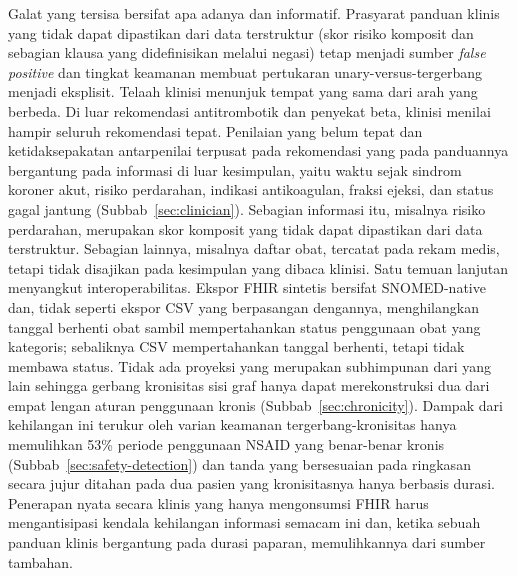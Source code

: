 Galat yang tersisa bersifat apa adanya dan informatif. Prasyarat panduan klinis yang tidak dapat
dipastikan dari data terstruktur (skor risiko komposit dan sebagian klausa yang didefinisikan
melalui negasi) tetap menjadi sumber \emph{false positive} dan tingkat keamanan membuat
pertukaran unary-versus-tergerbang menjadi eksplisit. Telaah klinisi menunjuk tempat yang
sama dari arah yang berbeda. Di luar rekomendasi antitrombotik dan penyekat beta, klinisi
menilai hampir seluruh rekomendasi tepat. Penilaian yang belum tepat dan ketidaksepakatan
antarpenilai terpusat pada rekomendasi yang pada panduannya bergantung pada informasi di luar
kesimpulan, yaitu waktu sejak sindrom koroner akut, risiko perdarahan, indikasi antikoagulan,
fraksi ejeksi, dan status gagal jantung (Subbab~\ref{sec:clinician}). Sebagian informasi itu,
misalnya risiko perdarahan, merupakan skor komposit yang tidak dapat dipastikan dari data
terstruktur. Sebagian lainnya, misalnya daftar obat, tercatat pada rekam medis, tetapi tidak
disajikan pada kesimpulan yang dibaca klinisi. Satu temuan lanjutan menyangkut
interoperabilitas. Ekspor FHIR sintetis bersifat SNOMED-native dan, tidak seperti ekspor CSV
yang berpasangan dengannya, menghilangkan tanggal berhenti obat sambil mempertahankan status penggunaan
obat yang kategoris; sebaliknya CSV mempertahankan tanggal berhenti, tetapi tidak membawa
status. Tidak ada proyeksi yang merupakan subhimpunan dari yang lain sehingga gerbang
kronisitas sisi graf hanya dapat merekonstruksi dua dari empat lengan aturan penggunaan kronis
(Subbab~\ref{sec:chronicity}). Dampak dari kehilangan ini terukur oleh varian
keamanan tergerbang-kronisitas hanya memulihkan 53\% periode penggunaan NSAID yang
benar-benar kronis (Subbab~\ref{sec:safety-detection}) dan tanda yang bersesuaian pada
ringkasan secara jujur ditahan pada dua pasien yang kronisitasnya hanya berbasis durasi.
Penerapan nyata secara klinis yang hanya mengonsumsi FHIR harus mengantisipasi kendala kehilangan informasi
semacam ini dan, ketika sebuah panduan klinis bergantung pada durasi paparan, memulihkannya dari
sumber tambahan.
